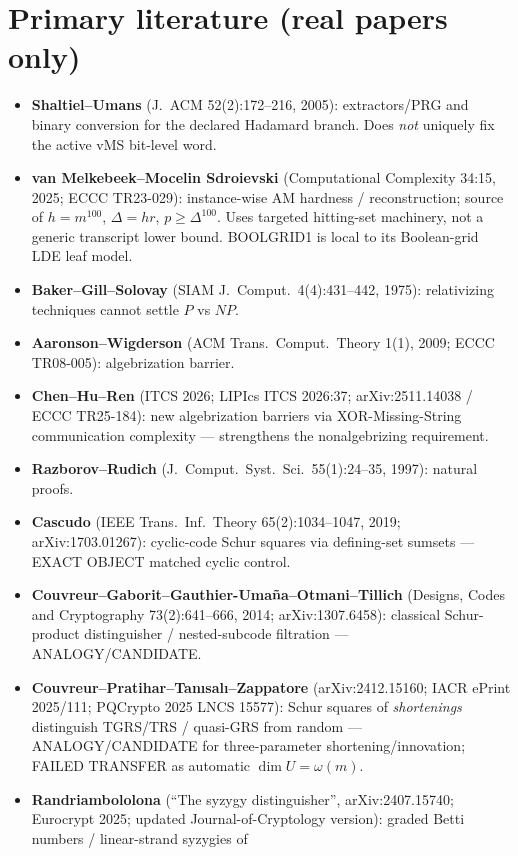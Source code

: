 \documentclass[11pt]{article}
\begin{document}
\section*{Primary literature (real papers only)}
\begin{itemize}
\item \textbf{Shaltiel--Umans} (J.~ACM 52(2):172--216, 2005): extractors/PRG and binary
conversion for the declared Hadamard branch. Does \emph{not} uniquely fix the active
vMS bit-level word.
\item \textbf{van Melkebeek--Mocelin Sdroievski} (Computational Complexity 34:15, 2025;
ECCC TR23-029): instance-wise AM hardness / reconstruction; source of $h=m^{100}$,
$\Delta=hr$, $p\ge\Delta^{100}$. Uses targeted hitting-set machinery, not a generic
transcript lower bound. BOOLGRID1 is local to its Boolean-grid LDE leaf model.
\item \textbf{Baker--Gill--Solovay} (SIAM J.\ Comput.\ 4(4):431--442, 1975): relativizing
techniques cannot settle $P$ vs $NP$.
\item \textbf{Aaronson--Wigderson} (ACM Trans.\ Comput.\ Theory 1(1), 2009; ECCC TR08-005):
algebrization barrier.
\item \textbf{Chen--Hu--Ren} (ITCS 2026; LIPIcs ITCS 2026:37; arXiv:2511.14038 / ECCC TR25-184):
new algebrization barriers via XOR-Missing-String communication complexity ---
strengthens the nonalgebrizing requirement.
\item \textbf{Razborov--Rudich} (J.\ Comput.\ Syst.\ Sci.\ 55(1):24--35, 1997): natural proofs.
\item \textbf{Cascudo} (IEEE Trans.\ Inf.\ Theory 65(2):1034--1047, 2019; arXiv:1703.01267):
cyclic-code Schur squares via defining-set sumsets --- EXACT OBJECT matched cyclic control.
\item \textbf{Couvreur--Gaborit--Gauthier-Uma\~na--Otmani--Tillich}
(Designs, Codes and Cryptography 73(2):641--666, 2014; arXiv:1307.6458): classical
Schur-product distinguisher / nested-subcode filtration --- ANALOGY/CANDIDATE.
\item \textbf{Couvreur--Pratihar--Tan{\i}sal{\i}--Zappatore} (arXiv:2412.15160; IACR ePrint
2025/111; PQCrypto 2025 LNCS 15577): Schur squares of \emph{shortenings} distinguish
TGRS/TRS / quasi-GRS from random --- ANALOGY/CANDIDATE for three-parameter
shortening/innovation; FAILED TRANSFER as automatic $\dim U=\omega(m)$.
\item \textbf{Randriambololona} (``The syzygy distinguisher'', arXiv:2407.15740; Eurocrypt 2025;
updated Journal-of-Cryptology version): graded Betti numbers / linear-strand syzygies of

\end{itemize}
\end{document}
